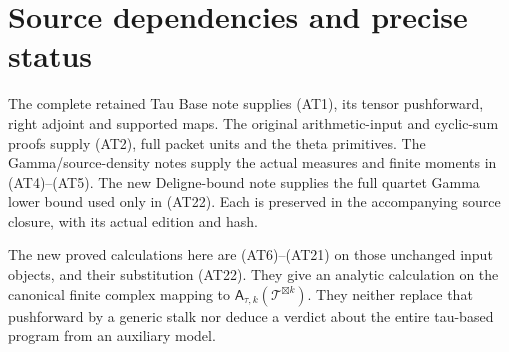 \section{Source dependencies and precise status}

The complete retained Tau Base note supplies (AT1), its tensor
pushforward, right adjoint and supported maps. The original
arithmetic-input and cyclic-sum proofs supply (AT2), full packet
units and the theta primitives. The Gamma/source-density notes
supply the actual measures and finite moments in (AT4)--(AT5).
The new Deligne-bound note supplies the full quartet Gamma
lower bound used only in (AT22). Each is preserved in the
accompanying source closure, with its actual edition and hash.

The new proved calculations here are (AT6)--(AT21) on those
unchanged input objects, and their substitution (AT22). They
give an analytic calculation on the canonical finite complex
mapping to $\mathsf A_{\tau,k}(\mathcal T^{\boxtimes k})$.
They neither replace that pushforward by a generic stalk nor
deduce a verdict about the entire tau-based program from an
auxiliary model.
